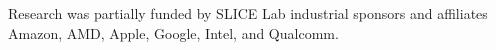 \documentclass[sigplan,review,nonacm,9pt]{acmart}
\begin{document}









\begin{acks}
Research was partially funded by SLICE Lab industrial sponsors and affiliates Amazon, AMD, Apple, Google, Intel, and Qualcomm.
\end{acks}




\end{document}
